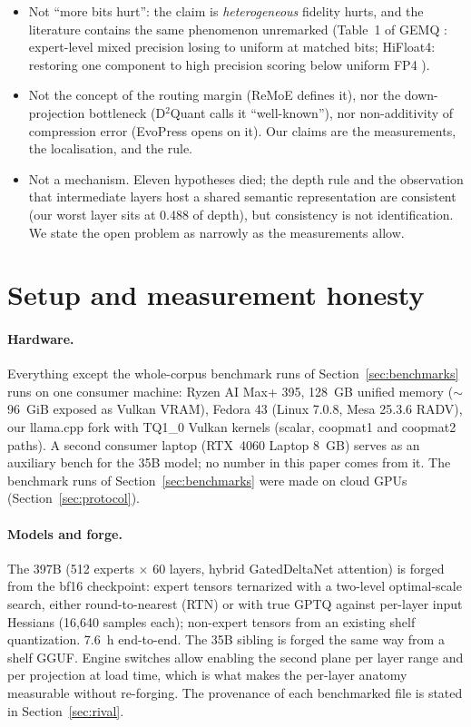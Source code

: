\documentclass[10pt]{article} %
\begin{document}
\begin{itemize}
\item Not ``more bits hurt'': the claim is \emph{heterogeneous} fidelity hurts, and the
  literature contains the same phenomenon unremarked (Table~1 of GEMQ \citep{gemq}: expert-level
  mixed precision losing to uniform at matched bits; HiFloat4:
  restoring one component to high precision scoring below uniform FP4 \citep{mak2026hifloat4}).
\item Not the concept of the routing margin (ReMoE \citep{zhu2026remoe} defines
  it), nor the down-projection bottleneck (D$^2$Quant \citep{yan2026d2quant} calls it ``well-known''),
  nor non-additivity of compression error (EvoPress \citep{sieberling2025evopress} opens on
  it). Our claims are the measurements, the localisation, and the rule.
\item Not a mechanism. Eleven hypotheses died; the depth rule and the
  observation that intermediate layers host a shared semantic representation
  \citep{wu2025semantichub} are consistent (our worst layer sits at 0.488 of
  depth), but consistency is not identification. We state the open problem as
  narrowly as the measurements allow.
\end{itemize}

\section{Setup and measurement honesty}
\label{sec:setup}

\paragraph{Hardware.} Everything except the whole-corpus benchmark runs of
Section~\ref{sec:benchmarks} runs on one consumer machine: Ryzen AI Max+ 395,
128~GB unified memory ($\sim$96~GiB exposed as Vulkan VRAM), Fedora 43 (Linux
7.0.8, Mesa 25.3.6 RADV), our llama.cpp
fork with TQ1\_0 Vulkan kernels (scalar, coopmat1 and coopmat2 paths). A
second consumer laptop (RTX~4060 Laptop 8~GB)
serves as an auxiliary bench for the 35B model; no number in this paper comes
from it. The benchmark runs of Section~\ref{sec:benchmarks} were made on cloud
GPUs (Section~\ref{sec:protocol}).

\paragraph{Models and forge.} The 397B (512 experts $\times$ 60 layers, hybrid GatedDeltaNet
attention) is forged from the bf16 checkpoint: expert tensors ternarized with
a two-level optimal-scale search, either round-to-nearest (RTN) or with true
GPTQ \citep{gptq} against per-layer input
Hessians (16{,}640 samples each); non-expert tensors from an existing shelf
quantization. 7.6~h end-to-end. The 35B sibling is forged the same way from
a shelf GGUF. Engine switches allow enabling the second plane per layer range
and per projection at load time, which is what makes the per-layer anatomy
measurable without re-forging. The provenance of each benchmarked file is
stated in Section~\ref{sec:rival}.
\end{document}
